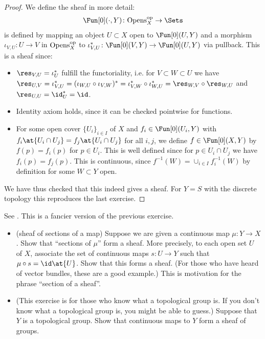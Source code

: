 \begin{proof}
  We define the sheaf in more detail:
  \begin{align*}
    \Fun[0](\cdot , Y) \colon \Opens_X^\op\rightarrow \Sets
  \end{align*}
  is defined by mapping an object $U\subset X$ open to $\Fun[0](U,Y)$
  and a morphism $\iota_{V,U} \colon U \rightarrow V$ in $\mathrm{Opens}_X^{\mathrm{op}}$ to
  $\iota^*_{V,U} \colon \Fun[0](V,Y) \rightarrow \Fun[0](U,Y)$ via
  pullback. This is a sheaf since:
  \begin{itemize}
  \item $\res_{V,U} = \iota_U^*$ fulfill the functoriality, i.e. for
    $V\subset W \subset U$ we have $\res_{U,V} = \iota_{V,U}^* = (\iota_{W,U}
    \circ \iota_{V,W})^* = \iota_{V,W}^* \circ \iota_{W,U}^* =
    \res_{W,V}\circ \res_{W,U}$ and $\res_{U,U}= \id_U^* = \id$.
  \item Identity axiom holds, since it can be checked pointwise for functions.
  \item For some open cover $\{U_i\}_{i\in I}$ of $X$ and $f_i\in
    \Fun[0](U_i,Y)$ with $f_i\at{U_i\cap U_j} = f_j \at{U_i\cap U_j}$
    for all $i,j$, we define $f\in \Fun[0](X,Y)$ by $f (p) = f_i(p)$
    for $p\in U_i$. This is well defined since for $ p \in U_i \cap
    U_j$ we have $f_i(p)=f_j(p)$.
    This is continuous, since $f^{-1}(W) = \cup_{i\in I} f_i^{-1}(W)$
    by definition for some $W\subset Y$ open.
  \end{itemize}
  We have thus checked that this indeed gives a sheaf. For $Y=S$ with
  the discrete topology this reproduces the last exercise.
\end{proof}

\begin{exercise}[2.2.G]
  See \cite[2.2.G]{vakil2024the-rising-sea}.
  This is a fancier version of the previous exercise.
  \begin{itemize}
  \item (sheaf of sections of a map) Suppose we are given a
    continuous map $\mu \colon Y \rightarrow X$. Show that ``sections of $\mu$'' form a
    sheaf. More precisely, to each open set $U$ of $X$, associate the set
    of continuous maps $s \colon U \rightarrow Y$ such that $\mu\circ
    s = \id\at{U}$. Show that
    this forms a sheaf. (For those who have heard of vector bundles,
    these are a good example.) This is motivation for the phrase
    ``section of a sheaf''.
  \item (This exercise is for those who know what a topological group
    is. If you don’t know what a topological group is, you might be
    able to guess.) Suppose that $Y$ is a topological group. Show that
    continuous maps to $Y$ form a sheaf of groups.
  \end{itemize}
\end{exercise}

